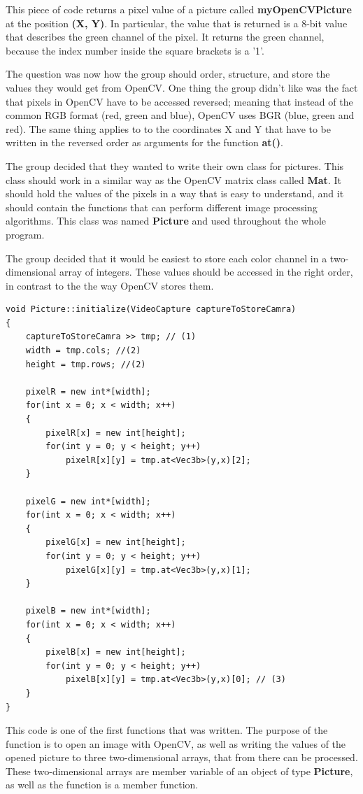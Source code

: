 This piece of code returns a pixel value of a picture called \textbf{myOpenCVPicture} at the position \textbf{(X, Y)}. In particular, the value that is returned is a 8-bit value that describes the green channel of the pixel. It returns the green channel, because the index number inside the square brackets is a '1'.

The question was now how the group should order, structure, and store the values they would get from OpenCV. One thing the group didn't like was the fact that pixels in OpenCV have to be accessed reversed; meaning that instead of the common RGB format (red, green and blue), OpenCV uses BGR (blue, green and red). The same thing applies to to the coordinates X and Y that have to be written in the reversed order as arguments for the function \textbf{at()}.

The group decided that they wanted to write their own class for pictures. This class should work in a similar way as the OpenCV matrix class called \textbf{Mat}. It should hold the values of the pixels in a way that is easy to understand, and it should contain the functions that can perform different image processing algorithms. This class was named \textbf{Picture} and used throughout the whole program.

The group decided that it would be easiest to store each color channel in a two-dimensional array of integers. These values should be accessed in the right order, in contrast to the the way OpenCV stores them.
\begin{lstlisting}
void Picture::initialize(VideoCapture captureToStoreCamra)
{
	captureToStoreCamra >> tmp; // (1)
	width = tmp.cols; //(2)
	height = tmp.rows; //(2)

	pixelR = new int*[width];
	for(int x = 0; x < width; x++)
	{
		pixelR[x] = new int[height];
		for(int y = 0; y < height; y++)
			pixelR[x][y] = tmp.at<Vec3b>(y,x)[2];
	}

	pixelG = new int*[width];
	for(int x = 0; x < width; x++)
	{
		pixelG[x] = new int[height];
		for(int y = 0; y < height; y++)
			pixelG[x][y] = tmp.at<Vec3b>(y,x)[1];
	}

	pixelB = new int*[width];
	for(int x = 0; x < width; x++)
	{
		pixelB[x] = new int[height];
		for(int y = 0; y < height; y++)
			pixelB[x][y] = tmp.at<Vec3b>(y,x)[0]; // (3)
	}
}
\end{lstlisting}
This code is one of the first functions that was written. The purpose of the function is to open an image with OpenCV, as well as writing the values of the opened picture to three two-dimensional arrays, that from there can be processed. These two-dimensional arrays are member variable of an object of type \textbf{Picture}, as well as the function is a member function.

